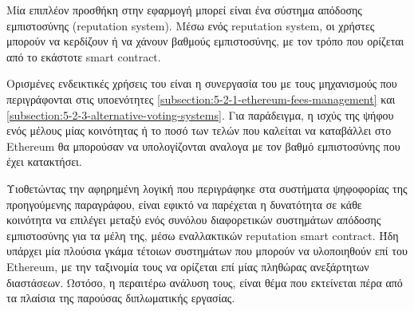 Μία επιπλέον προσθήκη στην εφαρμογή μπορεί είναι ένα σύστημα απόδοσης εμπιστοσύνης (reputation system). Μέσω ενός reputation system, οι χρήστες μπορούν να κερδίζουν ή να χάνουν βαθμούς εμπιστοσύνης, με τον τρόπο που ορίζεται από το εκάστοτε smart contract.

Ορισμένες ενδεικτικές χρήσεις του είναι η συνεργασία του με τους μηχανισμούς που περιγράφονται στις υποενότητες \ref{subsection:5-2-1-ethereum-fees-management} και \ref{subsection:5-2-3-alternative-voting-systems}. Για παράδειγμα, η ισχύς της ψήφου ενός μέλους μίας κοινότητας ή το ποσό των τελών που καλείται να καταβάλλει στο Ethereum θα μπορούσαν να υπολογίζονται αναλογα με τον βαθμό εμπιστοσύνης που έχει κατακτήσει.

Υιοθετώντας την αφηρημένη λογική που περιγράφηκε στα συστήματα ψηφοφορίας της προηγούμενης παραγράφου, είναι εφικτό να παρέχεται η δυνατότητα σε κάθε κοινότητα να επιλέγει μεταξύ ενός συνόλου διαφορετικών συστημάτων απόδοσης εμπιστοσύνης για τα μέλη της, μέσω εναλλακτικών reputation smart contract. Ήδη υπάρχει μία πλούσια γκάμα τέτοιων συστημάτων που μπορούν να υλοποιηθούν επί του Ethereum, με την ταξινομία τους να ορίζεται επί μίας πληθώρας ανεξάρτητων διαστάσεων.\cite{5.2-taxonomy-of-reputation-systems} Ωστόσο, η περαιτέρω ανάλυση τους, είναι θέμα που εκτείνεται πέρα από τα πλαίσια της παρούσας διπλωματικής εργασίας.
